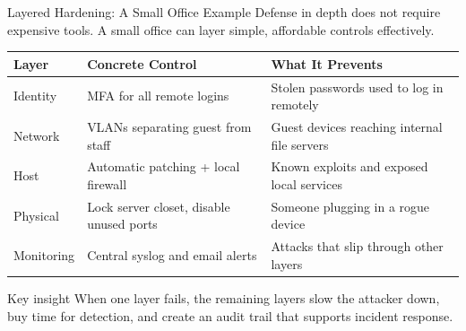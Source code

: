 \documentclass[aspectratio=169]{beamer}  %
\begin{document}
\begin{frame}{Layered Hardening: A Small Office Example}
    \footnotesize
    Defense in depth does not require expensive tools. A small office can layer simple, affordable controls effectively.

    \vspace{0.4em}
    \begin{table}[]
        \renewcommand{\arraystretch}{1.2}
        \centering
        \begin{tabular}{|l|l|l|}
        \hline
        \rowcolor[HTML]{EFEFEF} \textbf{Layer} & \textbf{Concrete Control} & \textbf{What It Prevents} \\ \hline
        Identity & MFA for all remote logins & Stolen passwords used to log in remotely \\ \hline
        Network & VLANs separating guest from staff & Guest devices reaching internal file servers \\ \hline
        Host & Automatic patching + local firewall & Known exploits and exposed local services \\ \hline
        Physical & Lock server closet, disable unused ports & Someone plugging in a rogue device \\ \hline
        Monitoring & Central syslog and email alerts & Attacks that slip through other layers \\ \hline
        \end{tabular}
    \end{table}

    \begin{exampleblock}{Key insight}
        \footnotesize
        When one layer fails, the remaining layers slow the attacker down, buy time for detection, and create an audit trail that supports incident response.
    \end{exampleblock}
\end{frame}
\end{document}
